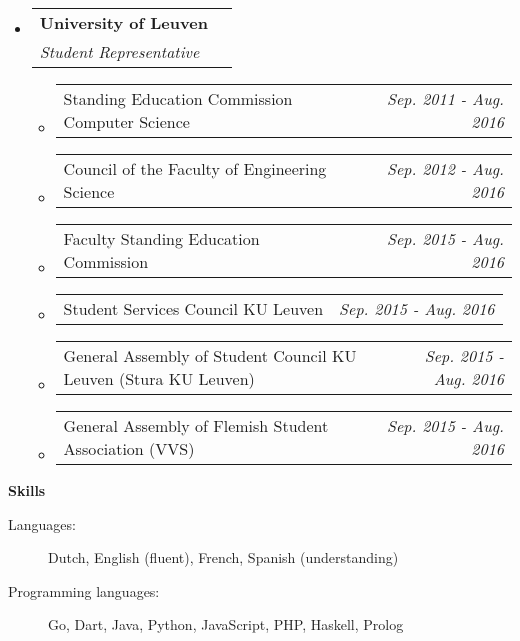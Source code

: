 \documentclass[letterpaper,11pt]{article}
\makeatletter
\newcommand{\resheading}[1]{{\large \colorbox{mygrey}{\begin{minipage}{\textwidth}{\textbf{#1 \vphantom{p\^{E}}}}\end{minipage}}}}
\newcommand{\ressubheading}[4]{
\begin{tabular*}{7.3in}{l@{\extracolsep{\fill}}r}
		\textbf{#1} & #2 \\
		\textit{#3} & \textit{#4} \\
\end{tabular*}\vspace{-6pt}}
\newcommand{\resdateitem}[2]{\item
\begin{tabular*}{6.95in}{l@{\extracolsep{\fill}}r}
		#1 & \textit{#2} \\
\end{tabular*}\vspace{-3pt}}
\makeatother
\begin{document}
\begin{itemize}[leftmargin=*]
\item[]
	\ressubheading{University of Leuven}{ }{Student Representative}{ }
	\begin{itemize}
		\resdateitem{Standing Education Commission Computer Science}{Sep. 2011 - Aug. 2016}
		\resdateitem{Council of the Faculty of Engineering Science}{Sep. 2012 - Aug. 2016}
		\resdateitem{Faculty Standing Education Commission}{Sep. 2015 - Aug. 2016} %
		\resdateitem{Student Services Council KU Leuven}{Sep. 2015 - Aug. 2016}
		\resdateitem{General Assembly of Student Council KU Leuven (Stura KU Leuven)}{Sep. 2015 - Aug. 2016}
		\resdateitem{General Assembly of Flemish Student Association (VVS)}{Sep. 2015 - Aug. 2016}
	\end{itemize}


\end{itemize}


\resheading{Skills}

\begin{description}
\item[Languages:]
Dutch, English (fluent), French, Spanish (understanding)
\item[Programming languages:]
Go, Dart, Java, Python, JavaScript, PHP, Haskell, Prolog
\end{description}
\end{document}
